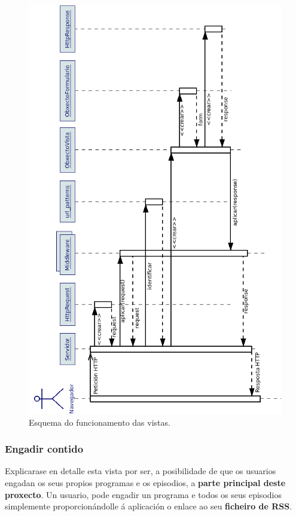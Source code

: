\begin{figure}[H]
	\centering
	\includegraphics[scale=0.6,keepaspectratio=true]{./images/secuencia_vista_v.png}
	\caption{Esquema do funcionamento das vistas.}
	\label{fig:vista}
\end{figure} 

 


\subsubsection{Engadir contido}
\label{rss_parser_section}

Explicarase en detalle esta vista por ser, a posibilidade de que os usuarios engadan os seus propios programas e os episodios, a \textbf{parte principal deste proxecto}. Un usuario, pode engadir un programa e todos os seus episodios simplemente proporcionándolle á aplicación o enlace ao seu \textbf{ficheiro de RSS}.

